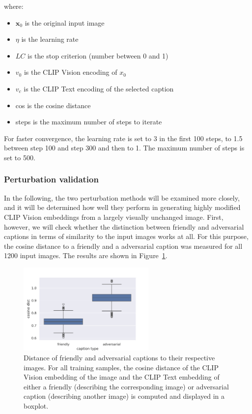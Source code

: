 where:
\begin{itemize}
    \item $\mathbf{x}_0$ is the original input image
    \item $\eta$ is the learning rate
    \item $LC$ is the stop criterion (number between 0 and 1)
    \item $v_0$ is the CLIP Vision encoding of $x_0$
    \item $v_c$ is the CLIP Text encoding of the selected caption
    \item cos is the cosine distance
    \item steps is the maximum number of steps to iterate
\end{itemize}

For faster convergence, the learning rate is set to 3 in the first 100 steps, to 1.5 between step 100 and step 300 and then to 1. The maximum number of steps is set to 500.

\subsubsection{Perturbation validation}

In the following, the two perturbation methods will be examined more closely, and it will be determined how well they perform in generating highly modified CLIP Vision embeddings from a largely visually unchanged image. First, however, we will check whether the distinction between friendly and adversarial captions in terms of similarity to the input images works at all. For this purpose, the cosine distance to a friendly and a adversarial caption was measured for all 1200 input images. The results are shown in Figure~\ref{fig:advpert_sanity_check_friendly_vs_adversarial_cap}.

\begin{figure}[ht]
    \centering
    \includegraphics[width=0.6\textwidth]{plots/advpert_sanity_check_friendly_vs_adversarial_cap.png}
    \caption[Similarity of caption embeddings to the respective images]{Distance of friendly and adversarial captions to their respective images. For all training samples, the cosine distance of the CLIP Vision embedding of the image and the CLIP Text embedding of either a friendly (describing the corresponding image) or adversarial caption (describing another image) is computed and displayed in a boxplot.}\label{fig:advpert_sanity_check_friendly_vs_adversarial_cap}
\end{figure}

